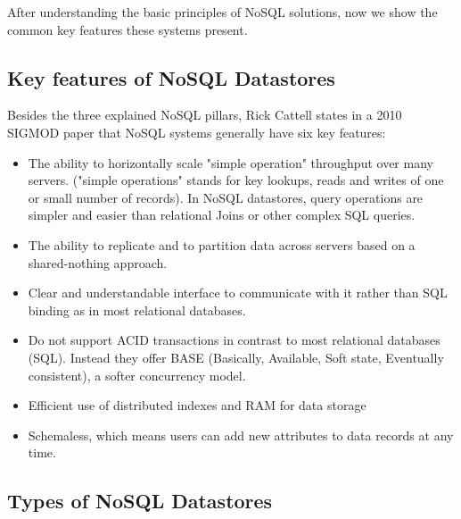 After understanding the basic principles of NoSQL solutions, now we show the common key features these systems present.

\subsection{Key features of NoSQL Datastores}

Besides the three explained NoSQL pillars, Rick Cattell states in a 2010 SIGMOD paper \cite{cattell2011scalable} that NoSQL systems generally have six key features:
\begin{itemize}
\item The ability to horizontally scale "simple operation" throughput over many servers. ("simple operations" stands for key lookups, reads and writes of one or small number of records). In NoSQL datastores, query operations are simpler and easier than relational Joins or other complex SQL queries.

\item The ability to replicate and to partition data across servers based on a shared-nothing approach.

\item Clear and understandable interface to communicate with it rather than SQL binding as in most relational databases.

\item Do not support ACID transactions in contrast to most relational databases (SQL). Instead they offer BASE (Basically, Available, Soft state, Eventually consistent), a softer concurrency model.

\item Efficient use of distributed indexes and RAM for data storage

\item Schemaless, which means users can add new attributes to data records at any time.

\end{itemize}


\subsection{Types of NoSQL Datastores}

